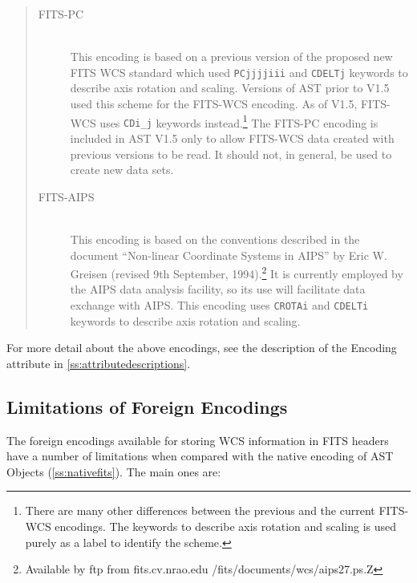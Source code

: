 \documentclass[twoside,11pt]{article}
\newcommand{\appref}[1]{Appendix~\ref{#1}}
\newcommand{\secref}[1]{\S\ref{#1}}
\renewcommand{\appref}[1]{\ref{#1}}
\renewcommand{\secref}[1]{\ref{#1}}
\begin{document}
\begin{quote}
\begin{description}
\item[FITS-PC]\mbox{}\\
This encoding is based on a previous version of the proposed new FITS WCS
standard which used {\tt PCjjjjiii} and {\tt CDELTj} keywords to describe
axis rotation and scaling. Versions of AST prior to V1.5 used this scheme
for the FITS-WCS encoding. As of V1.5, FITS-WCS uses {\tt CDi\_j}
keywords instead.\footnote{There are many other differences between the
previous and the current FITS-WCS encodings. The keywords to describe
axis rotation and scaling is used purely as a label to identify the
scheme.} The FITS-PC encoding is included in AST V1.5 only to allow
FITS-WCS data created with previous versions to be read. It should not,
in general, be used to create new data sets.

\item[FITS-AIPS]\mbox{}\\
This encoding is based on the conventions described in the document
``Non-linear Coordinate Systems in AIPS'' by Eric W. Greisen (revised 9th
September, 1994).\footnote{Available by ftp from fits.cv.nrao.edu
/fits/documents/wcs/aips27.ps.Z} It is currently employed by the AIPS
data analysis facility, so its use will facilitate data exchange with
AIPS. This encoding uses {\tt CROTAi} and {\tt CDELTi} keywords to
describe axis rotation and scaling.
\end{description}
\end{quote}

For more detail about the above encodings, see the description of the
Encoding attribute in \appref{ss:attributedescriptions}.

\subsection{\label{ss:foreignfitslimitations}Limitations of Foreign Encodings}

The foreign encodings available for storing WCS information in FITS
headers have a number of limitations when compared with the native
encoding of AST Objects (\secref{ss:nativefits}). The main ones are:
\end{document}

